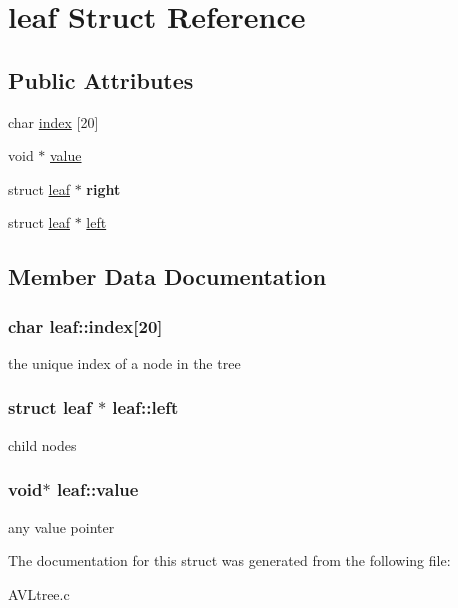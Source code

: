\hypertarget{structleaf}{}\section{leaf Struct Reference}
\label{structleaf}
\subsection*{Public Attributes}
\begin{DoxyCompactItemize}
\item 
char \hyperlink{structleaf_abd7b07b3d728534fecf1b2de81a94b5a}{index} \mbox{[}20\mbox{]}
\item 
void $\ast$ \hyperlink{structleaf_a0a3ab47be7b734c76770c6df880d9215}{value}
\item 
\hypertarget{structleaf_a87e1f8a1789d7b40f228f51a448171b7}{}struct \hyperlink{structleaf}{leaf} $\ast$ {\bfseries right}\label{structleaf_a87e1f8a1789d7b40f228f51a448171b7}

\item 
struct \hyperlink{structleaf}{leaf} $\ast$ \hyperlink{structleaf_a447859c87cec213333897e89fe58c0cb}{left}
\end{DoxyCompactItemize}


\subsection{Member Data Documentation}
\hypertarget{structleaf_abd7b07b3d728534fecf1b2de81a94b5a}{}
\subsubsection[{index}]{\setlength{\rightskip}{0pt plus 5cm}char leaf\+::index\mbox{[}20\mbox{]}}\label{structleaf_abd7b07b3d728534fecf1b2de81a94b5a}
the unique index of a node in the tree \hypertarget{structleaf_a447859c87cec213333897e89fe58c0cb}{}
\subsubsection[{left}]{\setlength{\rightskip}{0pt plus 5cm}struct {\bf leaf} $\ast$ leaf\+::left}\label{structleaf_a447859c87cec213333897e89fe58c0cb}
child nodes \hypertarget{structleaf_a0a3ab47be7b734c76770c6df880d9215}{}
\subsubsection[{value}]{\setlength{\rightskip}{0pt plus 5cm}void$\ast$ leaf\+::value}\label{structleaf_a0a3ab47be7b734c76770c6df880d9215}
any value pointer 

The documentation for this struct was generated from the following file\+:\begin{DoxyCompactItemize}
\item 
A\+V\+Ltree.\+c\end{DoxyCompactItemize}
